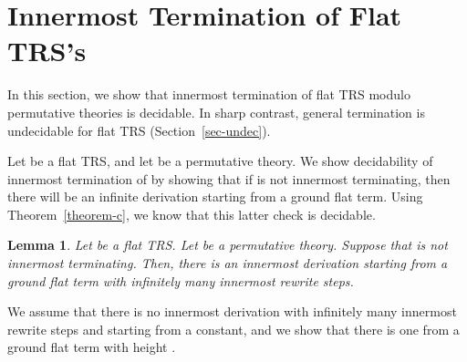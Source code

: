 \documentclass{LMCS}
\theoremstyle{plain}
\newtheorem{lemma}[thm]{Lemma}
\newcommand\ignore[1]{}
\begin{document}
\ignore{
We state below a related new (up to our knowledge) theorem that
uses a similar argument as the proof
of Theorem~\ref{theorem-c}.
\begin{thm}\label{theorem-unused}
Let  be a class of TRS's that are effectively
regularity preserving.
Termination of a TRS  of 
from a term , where both  and  are given as input, is decidable.
\end{thm}
\proof
Note that  is a regular tree language.
Since  is effectively regularity preserving,
we can compute a tree automaton  recognizing the
set of terms reachable from .
The size of the language recognized by  can be
checked to be infinite, in which case we know that there exists
a derivation starting from  with infinitely many
rewrite steps. Otherwise, we have a finite
number of terms reachable from . By producing all possible
derivations starting from  we will either detect a cycle,
thus concluding non-termination, or will halt, thus concluding
termination.\qed



We shall not use Theorem~\ref{theorem-unused} in this paper.
However, we note here that, using recent results on
regularity preserving TRS~\cite{TakaiKajiSeki00:RTA},  
we immediately get very simple
proofs of known decidability results, such as for
right-ground TRS~\cite{Dershowitz81:ICALP}: a right-ground
TRS is regularity preserving, and is non-terminating iff it is 
non-terminating from some right-hand side, which can
be checked for every one using Theorem~\ref{theorem-unused}.
\endignore}

\section{Innermost Termination of Flat TRS's}\label{sec-innermost}

\noindent In this section, we show that innermost termination 
of flat TRS modulo permutative theories is decidable. In sharp contrast,
general termination is undecidable for 
flat TRS (Section~\ref{sec-undec}).

Let  be a flat TRS, and let  be a permutative theory.
We show decidability of innermost termination of
 by showing that 
if  is not innermost terminating, then
there will be an infinite  derivation starting 
from a ground flat term.
Using Theorem~\ref{theorem-c}, we know that this latter 
check is decidable.

\begin{lemma}\label{lemma-flat-innermost}
Let  be a flat TRS.
Let  be a permutative theory.
Suppose that  is not
innermost terminating. Then, there is an
innermost derivation starting from
a ground flat term with infinitely many innermost rewrite steps.
\end{lemma}
\proof
We assume that
there is no innermost derivation with infinitely many
innermost rewrite steps and starting from a constant, and we
show that there is one from a ground flat term with height .
\end{document}
